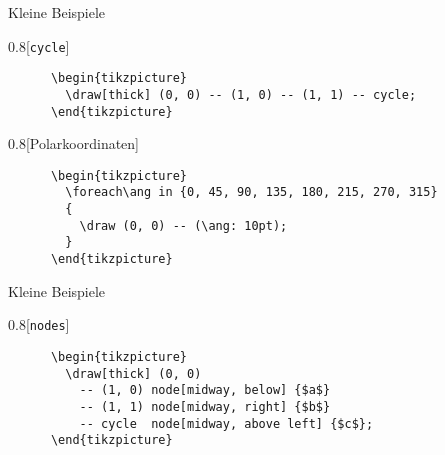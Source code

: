 \begin{frame}[fragile]{Kleine Beispiele}
  \begin{CodeExample}{0.8}[\texttt{cycle}]
    \begin{lstlisting}
      \begin{tikzpicture}
        \draw[thick] (0, 0) -- (1, 0) -- (1, 1) -- cycle;
      \end{tikzpicture}
    \end{lstlisting}
  \CodeResult
  \end{CodeExample}
  \begin{CodeExample}{0.8}[Polarkoordinaten]
    \begin{lstlisting}
      \begin{tikzpicture}
        \foreach\ang in {0, 45, 90, 135, 180, 215, 270, 315}
        {
          \draw (0, 0) -- (\ang: 10pt);
        }
      \end{tikzpicture}
    \end{lstlisting}
  \CodeResult
  \end{CodeExample}
\end{frame}

\begin{frame}[fragile]{Kleine Beispiele}
  \begin{CodeExample}{0.8}[\texttt{nodes}]
    \begin{lstlisting}
      \begin{tikzpicture}
        \draw[thick] (0, 0)
          -- (1, 0) node[midway, below] {$a$}
          -- (1, 1) node[midway, right] {$b$}
          -- cycle  node[midway, above left] {$c$};
      \end{tikzpicture}
    \end{lstlisting}
  \CodeResult
  \end{CodeExample}
\end{frame}

